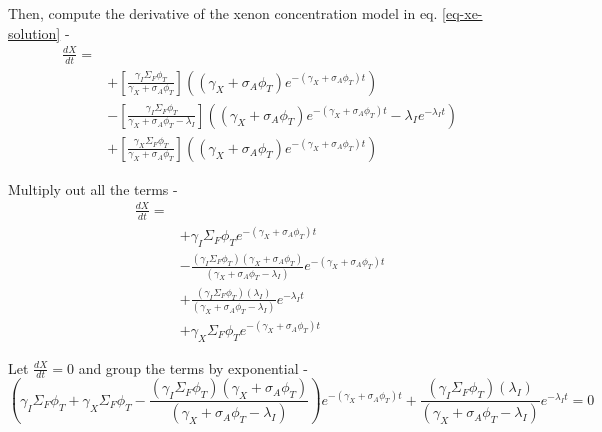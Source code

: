 \documentclass[11pt,a4paper]{article}
\begin{document}
\noindent Then, compute the derivative of the xenon concentration model in eq. \ref{eq-xe-solution} - 
\begin{equation} \label{eq-xe-derivative}
    \begin{aligned}
        \frac{dX}{dt}=\\
        & +[\frac{\gamma_I\Sigma_F\phi_T}{\gamma_X+\sigma_A\phi_T}]((\gamma_X+\sigma_A\phi_T)e^{-(\gamma_X+\sigma_A\phi_T)t}) \\
        & -[\frac{\gamma_I\Sigma_F\phi_T}{\gamma_X+\sigma_A\phi_T-\lambda_I}]((\gamma_X+\sigma_A\phi_T)e^{-(\gamma_X+\sigma_A\phi_T)t}-\lambda_Ie^{-\lambda_I t}) \\ 
        & +[\frac{\gamma_X\Sigma_F\phi_T}{\gamma_X+\sigma_A\phi_T}]((\gamma_X+\sigma_A\phi_T)e^{-(\gamma_X+\sigma_A\phi_T)t})
    \end{aligned}
\end{equation}
\vspace{\baselineskip}

\noindent Multiply out all the terms - 
\begin{equation}
    \begin{aligned}
        \frac{dX}{dt}=\\
        & +\gamma_I\Sigma_F\phi_T e^{-(\gamma_X+\sigma_A\phi_T)t} \\
        & -\frac{(\gamma_I\Sigma_F\phi_T)(\gamma_X+\sigma_A\phi_T)}{(\gamma_X+\sigma_A\phi_T-\lambda_I)}e^{-(\gamma_X+\sigma_A\phi_T)t} \\
        & +\frac{(\gamma_I\Sigma_F\phi_T)(\lambda_I)}{(\gamma_X+\sigma_A\phi_T-\lambda_I)}e^{-\lambda_I t} \\
        & +\gamma_X\Sigma_F\phi_T e^{-(\gamma_X+\sigma_A\phi_T)t}
    \end{aligned}
\end{equation}
\vspace{\baselineskip}

\noindent Let $\frac{dX}{dt} = 0$ and group the terms by exponential -
\begin{equation}
    (\gamma_I\Sigma_F\phi_T+\gamma_X\Sigma_F\phi_T-\frac{(\gamma_I\Sigma_F\phi_T)(\gamma_X+\sigma_A\phi_T)}{(\gamma_X+\sigma_A\phi_T-\lambda_I)})e^{-(\gamma_X+\sigma_A\phi_T)t}+\frac{(\gamma_I\Sigma_F\phi_T)(\lambda_I)}{(\gamma_X+\sigma_A\phi_T-\lambda_I)}e^{-\lambda_I t}=0
\end{equation}
\vspace{\baselineskip}
\end{document}
